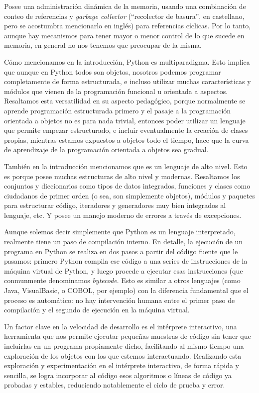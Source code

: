 Posee una administración dinámica de la memoria, usando una combinación de conteo de referencias y \textit{garbage collector} (``recolector de basura'', en castellano, pero se acostumbra mencionarlo en inglés) para referencias cíclicas. Por lo tanto, aunque hay mecanismos para tener mayor o menor control de lo que sucede en memoria, en general no nos tenemos que preocupar de la misma.

Cómo mencionamos en la introducción, Python es multiparadigma. Esto implica que aunque en Python todos son objetos, nosotros podemos programar completamente de forma estructurada, e incluso utilizar muchas características y módulos que vienen de la programación funcional u orientada a aspectos. Resaltamos esta versatilidad en su aspecto pedagógico, porque normalmente se aprende programación estructurada primero y el pasaje a la programación orientada a objetos no es para nada trivial, entonces poder utilizar un lenguaje que permite empezar estructurado, e incluir eventualmente la creación de clases propias, mientras estamos expuestos a objetos todo el tiempo, hace que la curva de aprendizaje de la programación orientada a objetos sea gradual.

También en la introducción mencionamos que es un lenguaje de alto nivel. Esto es porque posee muchas estructuras de alto nivel y modernas. Resaltamos los conjuntos y diccionarios como tipos de datos integrados, funciones y clases como ciudadanos de primer orden (o sea, son simplemente objetos), módulos y paquetes para estructurar código, iteradores y generadores muy bien integrados al lenguaje, etc. Y posee un manejo moderno de errores a través de excepciones.

Aunque solemos decir simplemente que Python es un lenguaje interpretado, realmente tiene un paso de compilación interno. En detalle, la ejecución de un programa en Python se realiza en dos pasos a partir del código fuente que le pasamos: primero Python compila ese código a una series de instrucciones de la máquina virtual de Python, y luego procede a ejecutar esas instrucciones (que conmunmente denominamos \textit{bytecode}. Esto es similar a otros lenguajes (como Java, VisualBasic, o COBOL, por ejemplo) con la diferencia fundamental que el proceso es automático: no hay intervención humana entre el primer paso de compilación y el segundo de ejecución en la máquina virtual.

Un factor clave en la velocidad de desarrollo es el intérprete interactivo, una herramienta que nos permite ejecutar pequeñas muestras de código sin tener que incluirlas en un programa propiamente dicho, facilitando al mismo tiempo una exploración de los objetos con los que estemos interactuando. Realizando esta exploración y experimentación en el intérprete interactivo, de forma rápida y sencilla, se logra incorporar al código esos algoritmos o líneas de código ya probadas y estables, reduciendo notablemente el ciclo de prueba y error.

